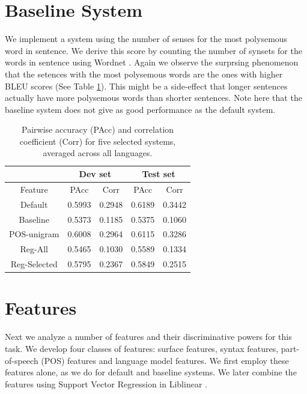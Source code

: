 \documentclass[11pt]{article}
\begin{document}
\section{Baseline System}
We implement a system using the number of senses for the most polysemous word in sentence. 
We derive this score by counting the number of synsets for the words in sentence using Wordnet \cite{Miller95wordnet:a}. 
Again we observe the surprsing phenomenon that the setences with the most polysemous words are the ones with higher BLEU scores (See Table \ref{basictable}). 
This might be a side-effect that longer sentences actually have more polysemous words than shorter sentences. 
Note here that the baseline system does not give as good performance as the default system. 

\begin{table}[ht]
\centering
\begin{small}
\begin{tabular}{c|cc|cc}
& \multicolumn{2}{c|}{Dev set} & \multicolumn{2}{c}{Test set} \\ \hline
Feature & PAcc & Corr & PAcc & Corr \\ \hline \hline
Default  & 0.5993 & 0.2948 & 0.6189 & 0.3442 \\
Baseline & 0.5373 & 0.1185 & 0.5375 & 0.1060 \\
POS-unigram & 0.6008 & 0.2964 & 0.6115 & 0.3286 \\
Reg-All & 0.5465 & 0.1030 & 0.5589 & 0.1334 \\
Reg-Selected & 0.5795 &  0.2367 & 0.5849 & 0.2515 \\
\end{tabular}
\end{small}
\caption{Pairwise accuracy (PAcc) and correlation coefficient (Corr) for five selected systems, averaged across all languages.}
\label{basictable}
\end{table}

\section{Features}
Next we analyze a number of features and their discriminative powers for this task.
We develop four classes of features: surface features, syntax features, part-of-speech (POS) features and language model features. 
We first employ these features alone, as we do for default and baseline systems.
We later combine the features using Support Vector Regression in Liblinear \cite{Fan:2008:LLL:1390681.1442794}. 
\end{document}
